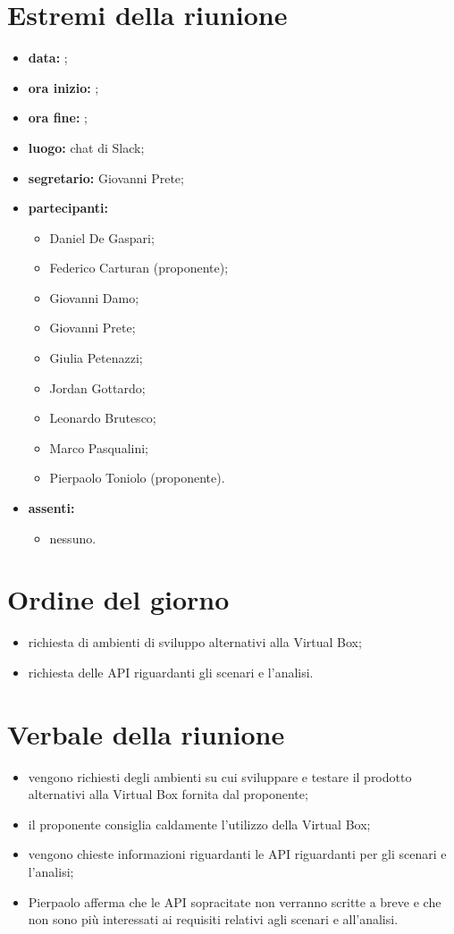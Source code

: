 \documentclass[a4paper,11pt]{article}
\begin{document}
	\section{Estremi della riunione}
	\begin{itemize}
		\item \textbf{data:} ;
		\item \textbf{ora inizio:} ;
		\item \textbf{ora fine:} ;
		\item \textbf{luogo:} chat di Slack;
		\item \textbf{segretario:} Giovanni Prete;
		\item \textbf{partecipanti:}
		\begin{itemize}
			 \item Daniel De Gaspari;
			 \item Federico Carturan (proponente);
			 \item Giovanni Damo;
			 \item Giovanni Prete;
			 \item Giulia Petenazzi;
			 \item Jordan Gottardo;
			 \item Leonardo Brutesco;
			 \item Marco Pasqualini;
			 \item Pierpaolo Toniolo (proponente).
		\end{itemize}
		\item \textbf{assenti:}
			\begin{itemize}
					 \item nessuno.
			\end{itemize}
	\end{itemize}
	\section{Ordine del giorno}
		\begin{itemize}
			\item richiesta di ambienti di sviluppo alternativi alla Virtual Box;
			\item richiesta delle API riguardanti gli scenari e l'analisi.
		\end{itemize}
	\section{Verbale della riunione}
	\begin{itemize}
		\item vengono richiesti degli ambienti su cui sviluppare e testare il prodotto alternativi alla Virtual Box fornita dal proponente;
		\item il proponente consiglia caldamente l'utilizzo della Virtual Box;
		\item vengono chieste informazioni riguardanti le API riguardanti per gli scenari e l'analisi;
		\item Pierpaolo afferma che le API sopracitate non verranno scritte a breve e che non sono più interessati ai requisiti relativi agli scenari e all'analisi.
	\end{itemize}
\end{document}
